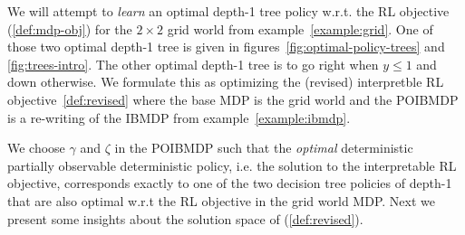     

    
    

We will attempt to \textit{learn} an optimal depth-1 tree policy w.r.t. the RL objective (\ref{def:mdp-obj}) for the $2\times 2$ grid world from example~\ref{example:grid}.
One of those two optimal depth-1 tree is given in figures~\ref{fig:optimal-policy-trees} and \ref{fig:trees-intro}. The other optimal depth-1 tree is to go right when $y\leq 1$ and down otherwise.
We formulate this as optimizing the (revised) interpretble RL objective~\ref{def:revised} where the base MDP is the grid world and the POIBMDP is a re-writing of the IBMDP from example~\ref{example:ibmdp}.

We choose $\gamma$ and $\zeta$ in the POIBMDP such that the \textit{optimal} deterministic partially observable deterministic policy, i.e. the solution to the interpretable RL objective, corresponds exactly to one of the two decision tree policies of depth-1 that are also optimal w.r.t the RL objective in the grid world MDP.
Next we present some insights about the solution space of (\ref{def:revised}).


